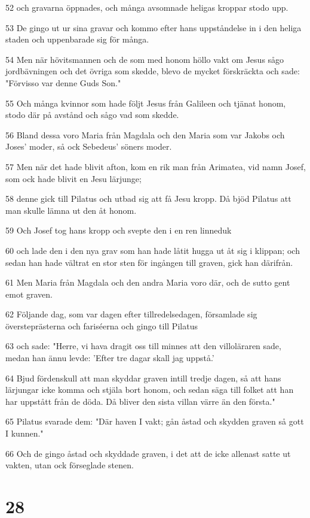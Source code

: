 \par 52 och gravarna öppnades, och många avsomnade heligas kroppar stodo upp.
\par 53 De gingo ut ur sina gravar och kommo efter hans uppståndelse in i den heliga staden och uppenbarade sig för många.
\par 54 Men när hövitsmannen och de som med honom höllo vakt om Jesus sågo jordbävningen och det övriga som skedde, blevo de mycket förskräckta och sade: "Förvisso var denne Guds Son."
\par 55 Och många kvinnor som hade följt Jesus från Galileen och tjänat honom, stodo där på avstånd och sågo vad som skedde.
\par 56 Bland dessa voro Maria från Magdala och den Maria som var Jakobs och Joses' moder, så ock Sebedeus' söners moder.
\par 57 Men när det hade blivit afton, kom en rik man från Arimatea, vid namn Josef, som ock hade blivit en Jesu lärjunge;
\par 58 denne gick till Pilatus och utbad sig att få Jesu kropp. Då bjöd Pilatus att man skulle lämna ut den åt honom.
\par 59 Och Josef tog hans kropp och svepte den i en ren linneduk
\par 60 och lade den i den nya grav som han hade låtit hugga ut åt sig i klippan; och sedan han hade vältrat en stor sten för ingången till graven, gick han därifrån.
\par 61 Men Maria från Magdala och den andra Maria voro där, och de sutto gent emot graven.
\par 62 Följande dag, som var dagen efter tillredelsedagen, församlade sig översteprästerna och fariséerna och gingo till Pilatus
\par 63 och sade: "Herre, vi hava dragit oss till minnes att den villoläraren sade, medan han ännu levde: 'Efter tre dagar skall jag uppstå.'
\par 64 Bjud fördenskull att man skyddar graven intill tredje dagen, så att hans lärjungar icke komma och stjäla bort honom, och sedan säga till folket att han har uppstått från de döda. Då bliver den sista villan värre än den första."
\par 65 Pilatus svarade dem: "Där haven I vakt; gån åstad och skydden graven så gott I kunnen."
\par 66 Och de gingo åstad och skyddade graven, i det att de icke allenast satte ut vakten, utan ock förseglade stenen.

\chapter{28}

